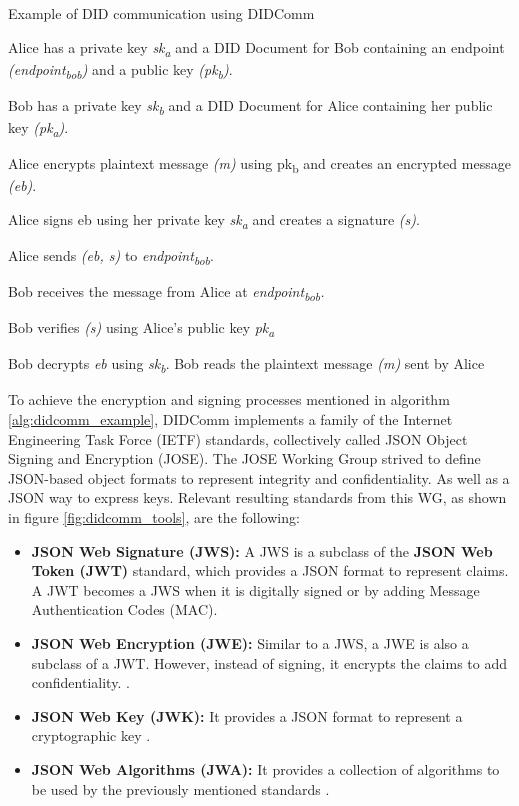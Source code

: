\begin{algorithm}[H]
\caption{Example of DID communication using DIDComm \cite{Abramson_2020}}
\label{alg:didcomm_example}
  \begin{algorithmic}[1]
    \State Alice has a private key \emph{sk\textsubscript{a}} and a DID Document for Bob containing an endpoint \emph{(endpoint\textsubscript{bob})} and a public key \emph{(pk\textsubscript{b})}.

    \State Bob has a private key \emph{sk\textsubscript{b}} and a DID Document for Alice containing her public key \emph{(pk\textsubscript{a})}.

    \State Alice encrypts plaintext message \emph{(m)} using pk\textsubscript{b} and creates an encrypted message \emph{(eb)}.

    \State Alice signs eb using her private key \emph{sk\textsubscript{a}} and creates a signature \emph{(s)}.

    \State Alice sends \emph{(eb, s)} to \emph{endpoint\textsubscript{bob}}.

    \State Bob receives the message from Alice at \emph{{endpoint\textsubscript{bob}}.}

    \State Bob verifies \emph{(s)} using Alice's public key \emph{pk\textsubscript{a}}

    \State Bob decrypts \emph{eb} using \emph{sk\textsubscript{b}}.
    \State Bob reads the plaintext message \emph{(m)} sent by Alice
    \EndIf
  \end{algorithmic}
\end{algorithm}

To achieve the encryption and signing processes mentioned in algorithm \ref{alg:didcomm_example}, DIDComm implements a family of the Internet Engineering Task Force (IETF) standards, collectively called JSON Object Signing and Encryption (JOSE). The JOSE Working Group strived to define JSON-based object formats to represent integrity and confidentiality. As well as a JSON way to express keys. Relevant resulting standards from this WG, as shown in figure \ref{fig:didcomm_tools}, are the following: 

\begin{itemize}
  \item \textbf{JSON Web Signature (JWS):}  A JWS is a subclass of the \textbf{JSON Web Token (JWT)} standard, which provides a JSON format to represent claims. A JWT becomes a JWS when it is digitally signed or by adding Message Authentication Codes (MAC)\cite{jones_bradley_sakimura_2015}.
  \item \textbf{JSON Web Encryption (JWE):} Similar to a JWS, a JWE is also a subclass of a JWT. However, instead of signing, it encrypts the claims to add confidentiality. \cite{jones_hildebrand_2015}.
  \item \textbf{JSON Web Key (JWK):} It provides a JSON format to represent a cryptographic key \cite{jones_2015}.
  \item \textbf{JSON Web Algorithms (JWA):} It provides a collection of algorithms to be used by the previously mentioned standards \cite{jones_2_2015}.
\end{itemize}

